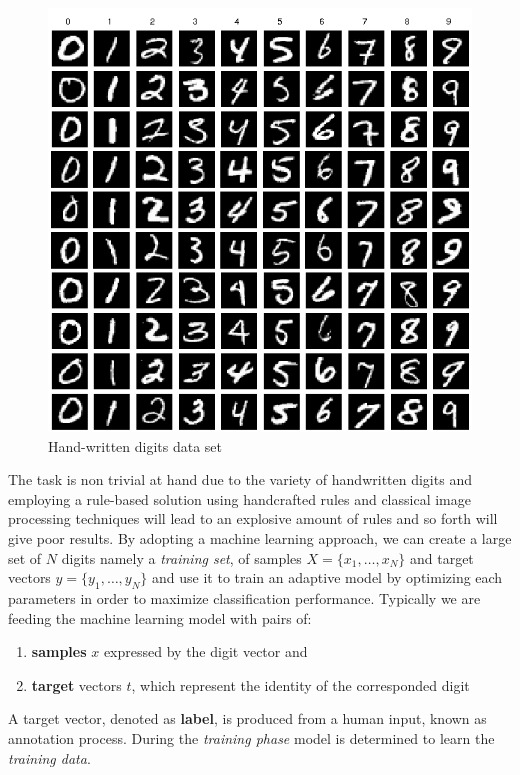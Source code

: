 \begin{figure}[h!]
    \centering  
    \includegraphics[width=.4\textwidth]{figures/chap3/ml/mnist}
    \caption{Hand-written digits data set}
    \label{c3:mnist}
\end{figure}

The task is non trivial at hand due to the variety of handwritten digits and employing a rule-based solution using handcrafted rules and classical image processing techniques will lead to an explosive amount of rules and so forth will give poor results.
By adopting a machine learning approach, we can create a large set of $N$ digits namely a \textit{training set}, of samples $X = \{x_1,\dots,x_N \}$ and target vectors $y = \{y_1,\dots,y_N \}$ and use it to train an adaptive model by optimizing each parameters in order to maximize classification performance.
Typically we are feeding the machine learning model with pairs of:
\begin{enumerate}
 \item \textbf{samples} $x$ expressed by the digit vector and 
 \item \textbf{target} vectors $t$, which represent the identity of the corresponded digit
\end{enumerate}

A target vector, denoted as \textbf{label}, is produced from a human input, known as annotation process.
During the \textit{training phase} model is determined to learn the \textit{training data}.

